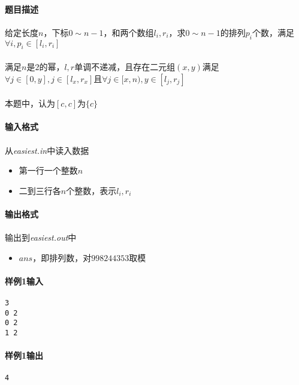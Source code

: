 \documentclass[UTF8]{ctexart}
\begin{document}
\paragraph{题目描述}
\paragraph{}给定长度$n$，下标$0\sim n-1$，和两个数组$l_i,r_i$，求$0\sim n-1$的排列$p_i$个数，满足$\forall i,p_i\in[l_i,r_i]$
\paragraph{}满足$n$是$2$的幂，$l,r$单调不递减，且存在二元组$(x,y)$满足$\forall j\in[0,y],j\in[l_x,r_x]$且$\forall j\in[x,n),y\in[l_j,r_j]$
\paragraph{}本题中，认为$[c,c]$为$\{c\}$
\paragraph{输入格式}
\paragraph{}从\emph{easiest.in}中读入数据
\begin{itemize}
	\item 第一行一个整数$n$
	\item 二到三行各$n$个整数，表示$l_i,r_i$
\end{itemize}
\paragraph{输出格式}
\paragraph{}输出到\emph{easiest.out}中
\begin{itemize}
	\item $ans$，即排列数，对$998244353$取模
\end{itemize}
\clearpage
\paragraph{样例1输入}
\begin{lstlisting}
3
0 2
0 2
1 2
\end{lstlisting}
\paragraph{样例1输出}
\begin{lstlisting}
4
\end{lstlisting}
\end{document}
